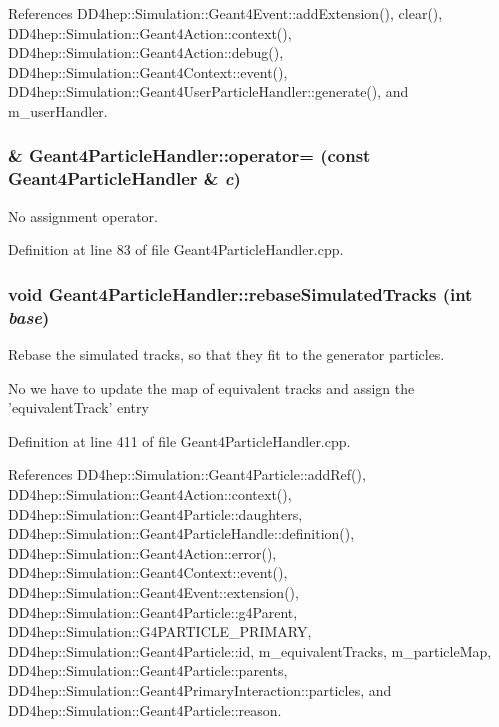 References DD4hep::Simulation::Geant4Event::addExtension(), clear(), DD4hep::Simulation::Geant4Action::context(), DD4hep::Simulation::Geant4Action::debug(), DD4hep::Simulation::Geant4Context::event(), DD4hep::Simulation::Geant4UserParticleHandler::generate(), and m\_\-userHandler.\hypertarget{class_d_d4hep_1_1_simulation_1_1_geant4_particle_handler_a880488dc828d7e3a38a4332347608fc2}{
\subsubsection[{operator=}]{ \& Geant4ParticleHandler::operator= (const {\bf Geant4ParticleHandler} \& {\em c})}}
\label{class_d_d4hep_1_1_simulation_1_1_geant4_particle_handler_a880488dc828d7e3a38a4332347608fc2}


No assignment operator. 

Definition at line 83 of file Geant4ParticleHandler.cpp.\hypertarget{class_d_d4hep_1_1_simulation_1_1_geant4_particle_handler_a27443ebbf322d022c1dc8337e02f089b}{
\subsubsection[{rebaseSimulatedTracks}]{\setlength{\rightskip}{0pt plus 5cm}void Geant4ParticleHandler::rebaseSimulatedTracks (int {\em base})}}
\label{class_d_d4hep_1_1_simulation_1_1_geant4_particle_handler_a27443ebbf322d022c1dc8337e02f089b}


Rebase the simulated tracks, so that they fit to the generator particles. 

No we have to update the map of equivalent tracks and assign the 'equivalentTrack' entry 

Definition at line 411 of file Geant4ParticleHandler.cpp.

References DD4hep::Simulation::Geant4Particle::addRef(), DD4hep::Simulation::Geant4Action::context(), DD4hep::Simulation::Geant4Particle::daughters, DD4hep::Simulation::Geant4ParticleHandle::definition(), DD4hep::Simulation::Geant4Action::error(), DD4hep::Simulation::Geant4Context::event(), DD4hep::Simulation::Geant4Event::extension(), DD4hep::Simulation::Geant4Particle::g4Parent, DD4hep::Simulation::G4PARTICLE\_\-PRIMARY, DD4hep::Simulation::Geant4Particle::id, m\_\-equivalentTracks, m\_\-particleMap, DD4hep::Simulation::Geant4Particle::parents, DD4hep::Simulation::Geant4PrimaryInteraction::particles, and DD4hep::Simulation::Geant4Particle::reason.

